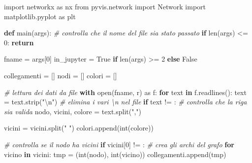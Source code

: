 \documentclass[11pt]{article}
\newenvironment{Shaded}{}{}
\newcommand{\KeywordTok}[1]{\textcolor[rgb]{0.00,0.44,0.13}{\textbf{{#1}}}}
\newcommand{\DecValTok}[1]{\textcolor[rgb]{0.25,0.63,0.44}{{#1}}}
\newcommand{\CharTok}[1]{\textcolor[rgb]{0.25,0.44,0.63}{{#1}}}
\newcommand{\StringTok}[1]{\textcolor[rgb]{0.25,0.44,0.63}{{#1}}}
\newcommand{\CommentTok}[1]{\textcolor[rgb]{0.38,0.63,0.69}{\textit{{#1}}}}
\newcommand{\NormalTok}[1]{{#1}}
\newcommand{\ImportTok}[1]{{#1}}
\newcommand{\VariableTok}[1]{\textcolor[rgb]{0.10,0.09,0.49}{{#1}}}
\newcommand{\ControlFlowTok}[1]{\textcolor[rgb]{0.00,0.44,0.13}{\textbf{{#1}}}}
\newcommand{\OperatorTok}[1]{\textcolor[rgb]{0.40,0.40,0.40}{{#1}}}
\newcommand{\BuiltInTok}[1]{{#1}}
\begin{document}
    \begin{Shaded}
\begin{Highlighting}[]
\ImportTok{import}\NormalTok{ networkx }\ImportTok{as}\NormalTok{ nx}
\ImportTok{from}\NormalTok{ pyvis.network }\ImportTok{import}\NormalTok{ Network}
\ImportTok{import}\NormalTok{ matplotlib.pyplot }\ImportTok{as}\NormalTok{ plt}


\KeywordTok{def}\NormalTok{ main(args):}
    \CommentTok{\# controlla che il nome del file sia stato passato}
    \ControlFlowTok{if} \BuiltInTok{len}\NormalTok{(args) }\OperatorTok{\textless{}=} \DecValTok{0}\NormalTok{: }\ControlFlowTok{return}

\NormalTok{    fname }\OperatorTok{=}\NormalTok{ args[}\DecValTok{0}\NormalTok{]}
\NormalTok{    in\_jupyter }\OperatorTok{=} \VariableTok{True} \ControlFlowTok{if} \BuiltInTok{len}\NormalTok{(args) }\OperatorTok{\textgreater{}=} \DecValTok{2} \ControlFlowTok{else} \VariableTok{False}
    
\NormalTok{    collegamenti }\OperatorTok{=}\NormalTok{ []}
\NormalTok{    nodi }\OperatorTok{=}\NormalTok{ []}
\NormalTok{    colori }\OperatorTok{=}\NormalTok{ []}

    \CommentTok{\# lettura dei dati da file}
    \ControlFlowTok{with} \BuiltInTok{open}\NormalTok{(fname, }\StringTok{\textquotesingle{}r\textquotesingle{}}\NormalTok{) }\ImportTok{as}\NormalTok{ f:}
        \ControlFlowTok{for}\NormalTok{ text }\KeywordTok{in}\NormalTok{ f.readlines():}
\NormalTok{            text }\OperatorTok{=}\NormalTok{ text.strip(}\StringTok{"}\CharTok{\textbackslash{}n}\StringTok{"}\NormalTok{) }\CommentTok{\# elimina i vari \textbackslash{}n nel file}
            \ControlFlowTok{if}\NormalTok{ text }\OperatorTok{!=} \StringTok{\textquotesingle{}\textquotesingle{}}\NormalTok{:  }\CommentTok{\# controlla che la riga sia valida}
\NormalTok{                nodo, vicini, colore  }\OperatorTok{=}\NormalTok{ text.split(}\StringTok{","}\NormalTok{)}
                
\NormalTok{                vicini }\OperatorTok{=}\NormalTok{ vicini.split(}\StringTok{" "}\NormalTok{)}
\NormalTok{                colori.append(}\BuiltInTok{int}\NormalTok{(colore))}
                
                \CommentTok{\# controlla se il nodo ha vicini}
                \ControlFlowTok{if}\NormalTok{ vicini[}\DecValTok{0}\NormalTok{] }\OperatorTok{!=} \StringTok{\textquotesingle{}\textquotesingle{}}\NormalTok{:  }
                    \CommentTok{\# crea gli archi del grafo}
                    \ControlFlowTok{for}\NormalTok{ vicino }\KeywordTok{in}\NormalTok{ vicini: }
\NormalTok{                        tmp }\OperatorTok{=}\NormalTok{ (}\BuiltInTok{int}\NormalTok{(nodo), }\BuiltInTok{int}\NormalTok{(vicino))}
\NormalTok{                        collegamenti.append(tmp) }
                        

\end{Highlighting}
\end{Shaded}
\end{document}
